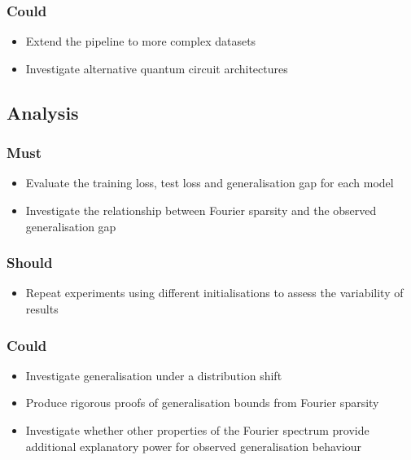 \begin{flushleft}
\subsubsection*{Could}
\begin{itemize}
    \item Extend the pipeline to more complex datasets
    \item Investigate alternative quantum circuit architectures
\end{itemize}

\subsection*{Analysis}
\subsubsection*{Must}
\begin{itemize}
    \item Evaluate the training loss, test loss and generalisation gap for each model
    \item Investigate the relationship between Fourier sparsity and the observed generalisation gap
\end{itemize}

\subsubsection*{Should}
\begin{itemize}
    \item Repeat experiments using different initialisations to assess the variability of results
\end{itemize}

\subsubsection*{Could}
\begin{itemize}
    \item Investigate generalisation under a distribution shift
    \item Produce rigorous proofs of generalisation bounds from Fourier sparsity
    \item Investigate whether other properties of the Fourier spectrum provide additional explanatory power for observed generalisation behaviour
\end{itemize}

\end{flushleft}
